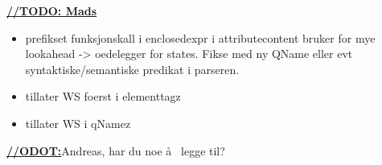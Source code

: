 \underline{\textbf{\LARGE //TODO: Mads}}
\begin{itemize}
		\item prefikset funksjonskall i enclosedexpr i attributecontent bruker for mye lookahead -> oedelegger for states. Fikse med ny QName eller evt syntaktiske/semantiske predikat i parseren.
		\item tillater WS foerst i elementtagz
		\item tillater WS i qNamez
	\end{itemize}

\underline{\textbf{\LARGE //ODOT:}}Andreas, har du noe \aa~ legge til?




